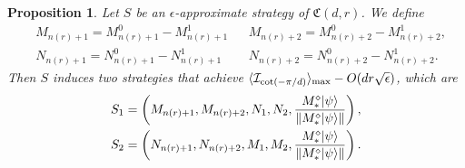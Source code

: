 \documentclass[11pt,letterpaper]{article}
\newcommand{\ket}[1]{|#1\rangle}
\DeclarePairedDelimiter{\norm}{\lVert}{\rVert}
\DeclarePairedDelimiter{\ip}{\langle}{\rangle}
\DeclareMathOperator{\spn}{span}
\DeclareMathOperator{\supp}{supp}
\newcommand{\1}{\mathbb{1}}
\newcommand{\nr}{n(r)}
\newcommand{\fC}{\mathfrak{C}}
\newcommand{\I}{\mathcal{I}}
\newcommand{\ep}{\epsilon}
\newcommand{\se}{\sqrt{\epsilon}}
\newtheorem{proposition}[theorem]{Proposition}
\theoremstyle{definition}
\begin{document}


\begin{proposition}
	\label{prop:s1s2}
	Let $S$ be an $\ep$-approximate strategy of $\fC(d,r)$. We define
	\begin{align}
		&M_{\nr+1} = M_{\nr+1}^0 - M_{\nr+1}^1  && 
		M_{\nr+2} = M_{\nr+2}^0 - M_{\nr+2}^1,\\
		&N_{\nr+1} = N_{\nr+1}^0 - N_{\nr+1}^1  && 
		N_{\nr+2} = N_{\nr+2}^0 - N_{\nr+2}^1.
	\end{align}
	Then $S$ induces two strategies that achieve $\ip{\I_{\cot(-\pi/d)}}_{\max} - O(d r\se)$, which are
	\begin{align}
		S_1 = \left(M_{\nr+1}, M_{\nr+2}, N_1, N_2, \frac{M_\ast^\diamond\ket{\psi}}{\norm{M_\ast^\diamond\ket{\psi}}}\right),\\
		S_2 = \left(N_{\nr+1}, N_{\nr+2}, M_1, M_2, \frac{M_\ast^\diamond\ket{\psi}}{\norm{M_\ast^\diamond\ket{\psi}}}\right).
	\end{align}
\end{proposition}
\end{document}
